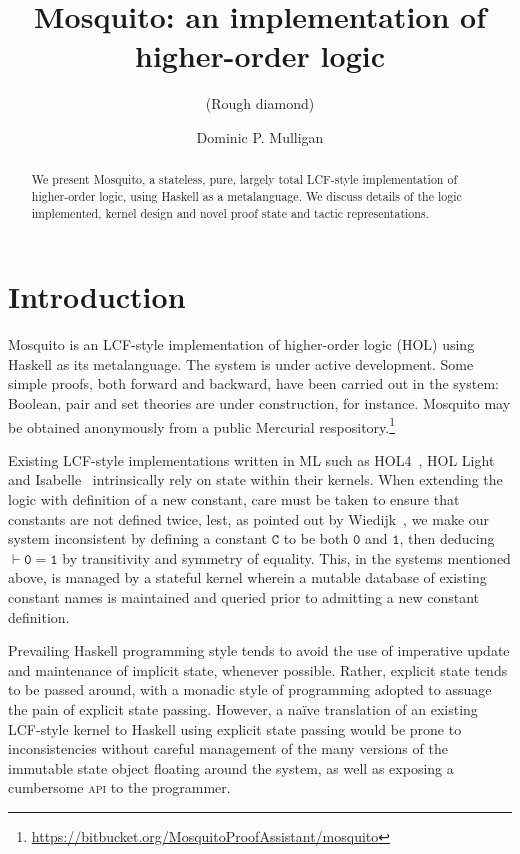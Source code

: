 \documentclass{llncs}
\author{Dominic P. Mulligan}
\title{Mosquito: an implementation of higher-order logic}
\subtitle{(Rough diamond)}
\institute{Computer Laboratory, University of Cambridge}
\newcommand{\mosquito}{Mosquito\xspace}
\begin{document}
\maketitle

\begin{abstract}
We present \mosquito, a stateless, pure, largely total LCF-style implementation of higher-order logic, using Haskell as a metalanguage.
We discuss details of the logic implemented, kernel design and novel proof state and tactic representations.
\end{abstract}

\section{Introduction}
\mosquito is an LCF-style implementation of higher-order logic (HOL) using Haskell as its metalanguage.
The system is under active development.
Some simple proofs, both forward and backward, have been carried out in the system: Boolean, pair and set theories are under construction, for instance.
\mosquito may be obtained anonymously from a public Mercurial respository.\footnote{\url{https://bitbucket.org/MosquitoProofAssistant/mosquito}}

Existing LCF-style implementations written in ML such as HOL4~\cite{gordon:introduction:1993}, HOL Light~\cite{harrison:hol:2009} and Isabelle~\cite{wenzel:isabelle:2008} intrinsically rely on state within their kernels.
When extending the logic with definition of a new constant, care must be taken to ensure that constants are not defined twice, lest, as pointed out by Wiedijk~\cite{wiedijk:stateless:2011}, we make our system inconsistent by defining a constant $\mathtt{C}$ to be both $\mathtt{0}$ and $\mathtt{1}$, then deducing $\vdash \mathtt{0 = 1}$ by transitivity and symmetry of equality.
This, in the systems mentioned above, is managed by a stateful kernel wherein a mutable database of existing constant names is maintained and queried prior to admitting a new constant definition.

Prevailing Haskell programming style tends to avoid the use of imperative update and maintenance of implicit state, whenever possible.
Rather, explicit state tends to be passed around, with a monadic style of programming adopted to assuage the pain of explicit state passing.
However, a na\"ive translation of an existing LCF-style kernel to Haskell using explicit state passing would be prone to inconsistencies without careful management of the many versions of the immutable state object floating around the system, as well as exposing a cumbersome \textsc{api} to the programmer.
\end{document}
